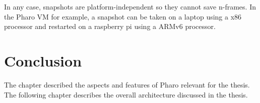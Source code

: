\documentclass[a4paper,12pt,twoside]{../includes/ThesisStyle}
\begin{document}
In any case, snapshots are platform-independent so they cannot save n-frames. In the Pharo VM for example, a snapshot can be taken on a laptop using a x86 processor and restarted on a raspberry pi using a ARMv6 processor.


\section*{Conclusion} 

The chapter described the aspects and features of Pharo relevant for the thesis. The following chapter describes the overall architecture discussed in the thesis.

\ifx\wholebook\relax\else
    
\end{document}
